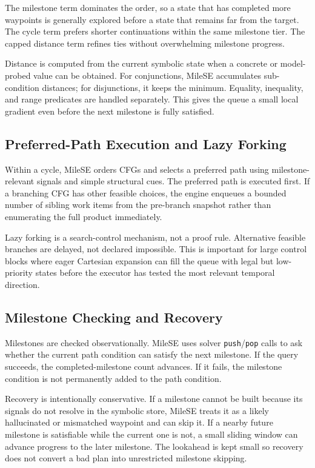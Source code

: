 \documentclass[conference]{IEEEtran}
\begin{document}
The milestone term dominates the order, so a state that has completed more waypoints is generally explored before a state that remains far from the target. The cycle term prefers shorter continuations within the same milestone tier. The capped distance term refines ties without overwhelming milestone progress.

Distance is computed from the current symbolic state when a concrete or model-probed value can be obtained. For conjunctions, MileSE accumulates sub-condition distances; for disjunctions, it keeps the minimum. Equality, inequality, and range predicates are handled separately. This gives the queue a small local gradient even before the next milestone is fully satisfied.

\subsection{Preferred-Path Execution and Lazy Forking}
Within a cycle, MileSE orders CFGs and selects a preferred path using milestone-relevant signals and simple structural cues. The preferred path is executed first. If a branching CFG has other feasible choices, the engine enqueues a bounded number of sibling work items from the pre-branch snapshot rather than enumerating the full product immediately.

Lazy forking is a search-control mechanism, not a proof rule. Alternative feasible branches are delayed, not declared impossible. This is important for large control blocks where eager Cartesian expansion can fill the queue with legal but low-priority states before the executor has tested the most relevant temporal direction.

\subsection{Milestone Checking and Recovery}
Milestones are checked observationally. MileSE uses solver \texttt{push}/\texttt{pop} calls to ask whether the current path condition can satisfy the next milestone. If the query succeeds, the completed-milestone count advances. If it fails, the milestone condition is not permanently added to the path condition.

Recovery is intentionally conservative. If a milestone cannot be built because its signals do not resolve in the symbolic store, MileSE treats it as a likely hallucinated or mismatched waypoint and can skip it. If a nearby future milestone is satisfiable while the current one is not, a small sliding window can advance progress to the later milestone. The lookahead is kept small so recovery does not convert a bad plan into unrestricted milestone skipping.
\end{document}
